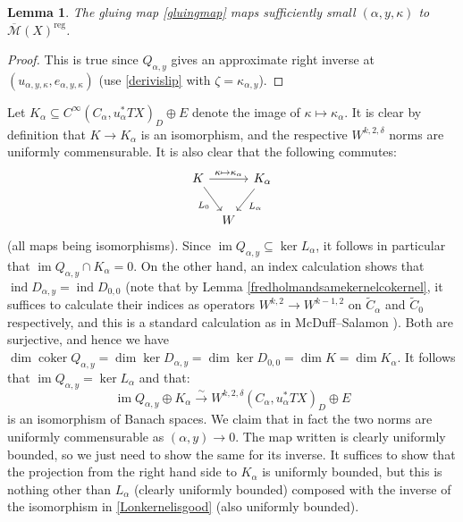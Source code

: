 \documentclass[12pt]{article}
\newtheorem{lemma}[theorem]{Lemma}
\theoremstyle{definition}
\theoremstyle{remark}
\numberwithin{equation}{subsection}
\newcommand{\ind}{\operatorname{ind}}
\newcommand{\Mbar}{\overline{\mathcal M}}
\newcommand{\coker}{\operatorname{coker}}
\newcommand{\im}{\operatorname{im}}
\newcommand{\reg}{\mathrm{reg}}
\begin{document}
\begin{lemma}
The gluing map \eqref{gluingmap} maps sufficiently small $(\alpha,y,\kappa)$ to $\Mbar(X)^\reg$.
\end{lemma}

\begin{proof}
This is true since $Q_{\alpha,y}$ gives an approximate right inverse at $(u_{\alpha,y,\kappa},e_{\alpha,y,\kappa})$ (use \eqref{derivislip} with $\zeta=\kappa_{\alpha,y}$).
\end{proof}

Let $K_\alpha\subseteq C^\infty(C_\alpha,u_\alpha^\ast TX)_D\oplus E$ denote the image of $\kappa\mapsto\kappa_\alpha$.  It is clear by definition that $K\to K_\alpha$ is an isomorphism, and the respective $W^{k,2,\delta}$ norms are uniformly commensurable.  It is also clear that the following commutes:
\begin{equation}\label{Lonkernelisgood}
\begin{tikzcd}[column sep = tiny]
K\ar{dr}[swap]{L_0}\ar{rr}{\kappa\mapsto\kappa_\alpha}&&K_\alpha\ar{dl}{L_\alpha}\\
&W
\end{tikzcd}
\end{equation}
(all maps being isomorphisms).  Since $\im Q_{\alpha,y}\subseteq\ker L_\alpha$, it follows in particular that $\im Q_{\alpha,y}\cap K_\alpha=0$.  On the other hand, an index calculation shows that $\ind D_{\alpha,y}=\ind D_{0,0}$ (note that by Lemma \ref{fredholmandsamekernelcokernel}, it suffices to calculate their indices as operators $W^{k,2}\to W^{k-1,2}$ on $\tilde C_\alpha$ and $\tilde C_0$ respectively, and this is a standard calculation as in McDuff--Salamon \cite{mcduffsalamonJholsymp}).  Both are surjective, and hence we have $\dim\coker Q_{\alpha,y}=\dim\ker D_{\alpha,y}=\dim\ker D_{0,0}=\dim K=\dim K_\alpha$.  It follows that $\im Q_{\alpha,y}=\ker L_\alpha$ and that:
\begin{equation}\label{QKtoall}
\im Q_{\alpha,y}\oplus K_\alpha\xrightarrow\sim W^{k,2,\delta}(C_\alpha,u_\alpha^\ast TX)_D\oplus E
\end{equation}
is an isomorphism of Banach spaces.  We claim that in fact the two norms are uniformly commensurable as $(\alpha,y)\to 0$.  The map written is clearly uniformly bounded, so we just need to show the same for its inverse.  It suffices to show that the projection from the right hand side to $K_\alpha$ is uniformly bounded, but this is nothing other than $L_\alpha$ (clearly uniformly bounded) composed with the inverse of the isomorphism in \eqref{Lonkernelisgood} (also uniformly bounded).
\end{document}
